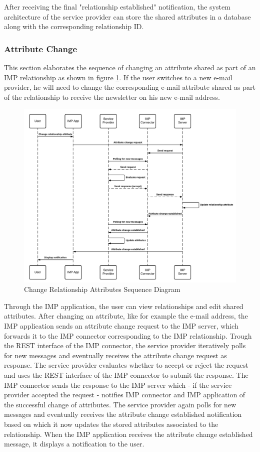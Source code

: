 After receiving the final "relationship established" notification, the system architecture of the service provider can store the shared attributes in a database along with the corresponding relationship ID.

\subsubsection{Attribute Change}
This section elaborates the sequence of changing an attribute shared as part of an IMP relationship as shown in figure \ref{imp:attribute_change}. If the user switches to a new e-mail provider, he will need to change the corresponding e-mail attribute shared as part of the relationship to receive the newsletter on his new e-mail address.

\begin{figure}[H]
    \centering
    \includegraphics[scale=0.6]{Diagrams/IMP Use Case Change Realtionship Attribute Sequence Diagram.pdf}
    \caption{Change Relationship Attributes Sequence Diagram}
    \label{imp:attribute_change}
\end{figure}

Through the IMP application, the user can view relationships and edit shared attributes. After changing an attribute, like for example the e-mail address, the IMP application sends an attribute change request to the IMP server, which forwards it to the IMP connector corresponding to the IMP relationship. Trough the REST interface of the IMP connector, the service provider iteratively polls for new messages and eventually receives the attribute change request as response. The service provider evaluates whether to accept or reject the request and uses the REST interface of the IMP connector to submit the response. The IMP connector sends the response to the IMP server which - if the service provider accepted the request - notifies IMP connector and IMP application of the successful change of attributes. The service provider again polls for new messages and eventually receives the attribute change established notification based on which it now updates the stored attributes associated to the relationship. When the IMP application receives the attribute change established message, it displays a notification to the user.

